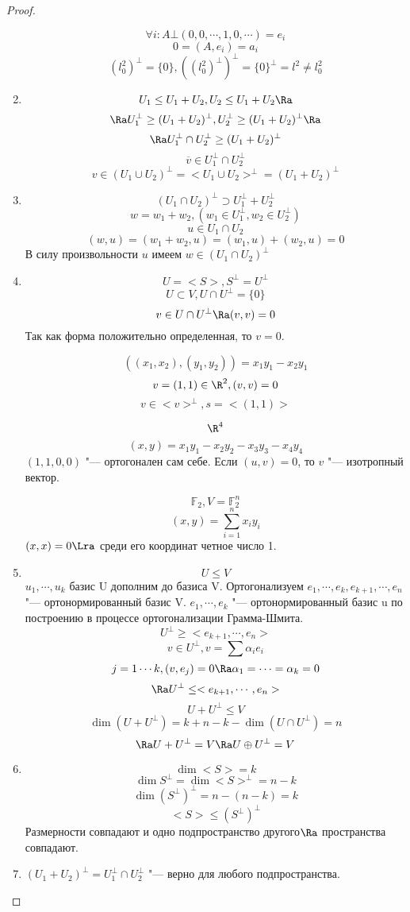 \begin{proof}
\begin{enumerate}
\begin{exmp}
    $$\forall i \colon A \bot (0, 0, \cdots, 1, 0, \cdots) = e_i$$
    $$0 = (A, e_i) = a_i$$
    $$(l_0^2)^{\bot} = \{0\}, ((l_0^2)^{\bot})^{\bot} = \{0\}^{\bot} = l^2 \ne l_0^2$$
    \end{exmp}
    \item 
    $$U_1 \le U_1 + U_2, U_2 \le U_1 + U_2 \Ra $$
    $$\Ra U_1^{\bot} \ge (U_1 + U_2)^{\bot}, U_2^{\bot} \ge (U_1 + U_2)^{\bot} \Ra$$
    $$\Ra U_1^{\bot} \cap U_2^{\bot} \ge (U_1 + U_2)^{\bot}$$
    $$\overline{v} \in  U_1^{\bot} \cap U_2^{\bot}$$
    $$v \in (U_1 \cup U_2)^{\bot} = <U_1 \cup U_2>^{\bot} = (U_1 + U_2)^{\bot}$$
    \item $$(U_1 \cap U_2)^{\bot} \supset U_1^{\bot} + U_2^{\bot}$$
    $$w = w_1 + w_2, (w_1 \in U_1^{\bot}, w_2 \in U_2^{\bot})$$
    $$u \in U_1 \cap U_2$$
    $$(w, u) = (w_1 + w_2, u) = (w_1, u) + (w_2, u) = 0$$
    В силу произвольности $u$ имеем $w \in (U_1 \cap U_2)^{\bot}$
    \item $$U = <S>, S^{\bot} = U^{\bot}$$
    $$U \subset V, U \cap U^{\bot} = \{0\}$$ 
    $$v \in U \cap U^{\bot} \Ra (v, v) = 0$$
    Так как форма положительно определенная, то $v = 0$.
    \begin{exmp}
    $$((x_1, x_2), (y_1, y_2)) = x_1 y_1 - x_2 y_1$$
    $$v = (1, 1) \in \R^{2}, (v, v) = 0$$
    $$v \in <v>^{\bot}, s = <(1, 1)>$$
    \end{exmp}
    \begin{exmp}
    $$\R^4$$
    $$(x, y) = x_1 y_1 - x_2 y_2 - x_3 y_3 - x_4 y_4$$
    $(1, 1, 0, 0)$  "--- ортогонален сам себе.
    Если $(u, v) = 0$, то $v$ "--- изотропный вектор. 
    \end{exmp}
    \begin{exmp}
    $$\mathbb{F}_2, V = \mathbb{F}_2^{n}$$
    $$(x, y) = \sum_{i = 1}^{n} x_i y_i$$
    $(x, x) = 0 \Lra$ среди его координат четное число 1.
    \end{exmp}
    \item $$U \le V$$
    $u_1, \cdots, u_k$ базис U дополним до базиса V.
    Ортогонализуем
    $e_1, \cdots, e_k, e_{k + 1}, \cdots, e_n$ "--- ортонормированный базис V.
    $e_1, \cdots, e_k$ "--- ортонормированный базис u по построению в процессе ортогонализации Грамма-Шмита.
    $$U^{\bot} \ge <e_{k + 1}, \cdots, e_{n}>$$
    $$v \in U^{\bot}, v = \sum \alpha_i e_i$$
    $$j = 1 \cdots k, (v, e_j) = 0 \Ra \alpha_1 = \cdots = \alpha_k = 0$$
    $$\Ra U^{\bot} \le <e_{k + 1}, \cdots, e_{n}> $$  
    $$U + U^{\bot} \le V$$
    $$\dim (U + U^{\bot}) = k + n - k - \dim (U \cap U^{\bot}) = n$$
    $$\Ra U + U^{\bot} = V \Ra U \oplus U^{\bot} = V$$
    \item 
    $$\dim <S> = k$$
    $$\dim S^{\bot} = \dim <S>^{\bot} = n - k$$
    $$\dim (S^{\bot})^{\bot} = n - (n - k) = k$$
    $$<S> \le (S^{\bot})^{\bot}$$
    Размерности совпадают и одно подпространство другого$\Ra$ пространства совпадают.
    \item $(U_1 + U_2)^{\bot} = U_1^{\bot} \cap U_2^{\bot}$  "--- верно для любого подпространства. 


\end{enumerate}
\end{proof}
